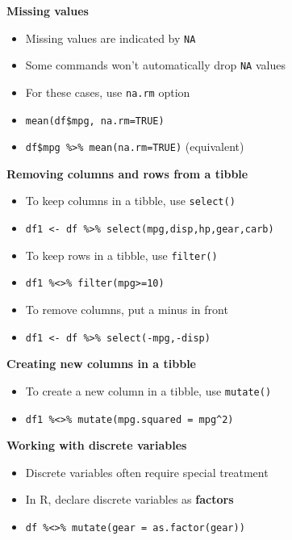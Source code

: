 \documentclass[10pt,landscape]{article}
\begin{document}
\begin{multicols}{3}
\smallskip{}

\textbf{Missing values}\\
\begin{itemize}
    \item Missing values are indicated by \verb!NA!
    \item Some commands won't automatically drop \verb!NA! values
    \item For these cases, use \verb!na.rm! option
    \item[] \verb!mean(df$mpg, na.rm=TRUE)!
    \item[] \verb!df$mpg %>% mean(na.rm=TRUE)! (equivalent)
\end{itemize}

\smallskip{}

\textbf{Removing columns and rows from a tibble}\\
\begin{itemize}
    \item To keep columns in a tibble, use \verb!select()!
    \item[] \verb!df1 <- df %>% select(mpg,disp,hp,gear,carb)!
    \item To keep rows in a tibble, use \verb!filter()!
    \item[] \verb!df1 %<>% filter(mpg>=10)!
    \item To remove columns, put a minus in front
    \item[] \verb!df1 <- df %>% select(-mpg,-disp)!
\end{itemize}

\smallskip{}

\textbf{Creating new columns in a tibble}\\
\begin{itemize}
    \item To create a new column in a tibble, use \verb!mutate()!
    \item[] \verb!df1 %<>% mutate(mpg.squared = mpg^2)!
\end{itemize}

\smallskip{}

\textbf{Working with discrete variables}\\
\begin{itemize}
    \item Discrete variables often require special treatment
    \item In R, declare discrete variables as \textbf{factors}
    \item[] \verb!df %<>% mutate(gear = as.factor(gear))!
\end{itemize}


\end{multicols}
\end{document}
